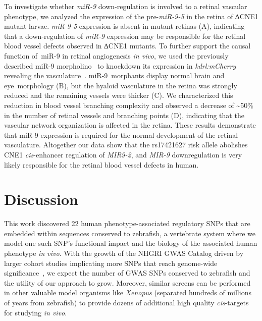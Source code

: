 To investigate whether \emph{miR-9} down-regulation is involved to a
retinal vascular phenotype, we analyzed the expression of the
pre-\emph{miR-9-5} in the retina of ∆CNE1 mutant larvae. \emph{miR-9-5}
expression is absent in mutant retinas (A), indicating that a
down-regulation of \emph{miR-9} expression may be responsible for the
retinal blood vessel defects observed in ∆CNE1 mutants. To further
support the causal function of~miR-9 in retinal angiogenesis \emph{in
vivo}, we used the previously described miR-9 morpholino~\citep{Leucht:2008ha, Coolen:2013dw} to knockdown its
expression in \emph{kdrl:mCherry} revealing the vasculature~\citep{Chi:2008dw}. miR-9~morphants display
normal brain and eye~morphology (B), but the hyaloid vasculature
in the retina was strongly reduced and the remaining vessels were
thicker (C). We characterized this reduction in blood vessel
branching complexity and observed a decrease of \textasciitilde{}50\% in
the number of retinal vessels and branching points (D), indicating
that the vascular network organization is affected in the retina. These
results demonstrate that miR-9 expression is required for the normal
development of the retinal vasculature. Altogether our data show that
the rs17421627 risk allele abolishes CNE1 \emph{cis}-enhancer regulation
of \emph{MIR9-2}, and \emph{MIR-9} downregulation is very likely
responsible for the retinal blood vessel defects in human.

\section{Discussion}

This work discovered 22 human phenotype-associated regulatory SNPs that
are embedded within sequences conserved to zebrafish, a vertebrate
system where we model one such SNP's functional impact and the biology
of the associated human phenotype \emph{in vivo}. With the growth of the
NHGRI GWAS Catalog driven by larger cohort studies implicating more SNPs
that reach genome-wide significance~\citep{SchizophreniaWorkingGroupofthePsychiatricGenomicsConsortium:2014eb}, we expect the number of GWAS SNPs conserved
to zebrafish and the utility of our approach to grow. Moreover, similar
screens can be performed in other valuable model organisms like \emph{Xenopus} (separated hundreds of millions of years from zebrafish)
to provide dozens of additional high quality \emph{cis}-targets for
studying \emph{in vivo}.

